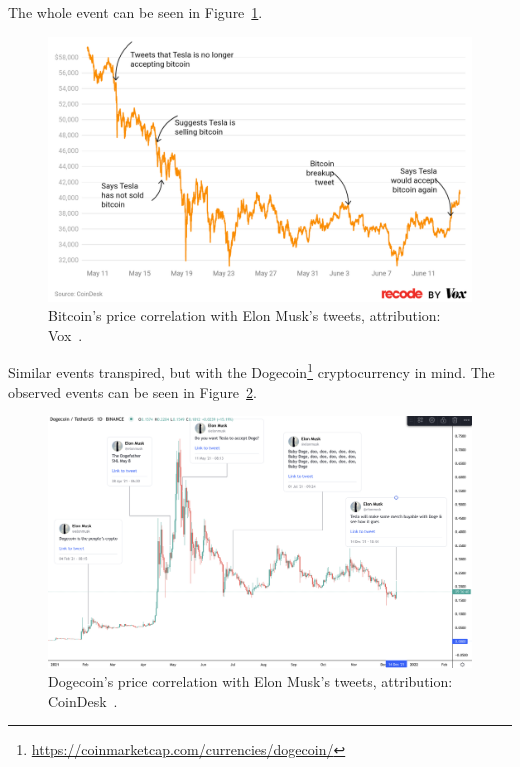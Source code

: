 The whole event can be seen in Figure~\ref{figure-vox-elon}.

\begin{figure}[!hbt]
    \centering
    \includegraphics[width=\columnwidth]{figures/vox-elon.png}
    \caption{Bitcoin's price correlation with Elon Musk's tweets, attribution: Vox~\cite{vox:elon}.}
    \label{figure-vox-elon}
\end{figure}

Similar events transpired, but with the Dogecoin\footnote{\url{https://coinmarketcap.com/currencies/dogecoin/}} cryptocurrency in mind. The observed events can be seen in Figure~\ref{figure-coindesk-elon}.

\begin{figure}[!hbt]
    \centering
    \includegraphics[width=\columnwidth]{figures/coindesk-elon.png}
    \caption{Dogecoin's price correlation with Elon Musk's tweets, attribution: CoinDesk~\cite{coindesk:elon}.}
    \label{figure-coindesk-elon}
\end{figure}

